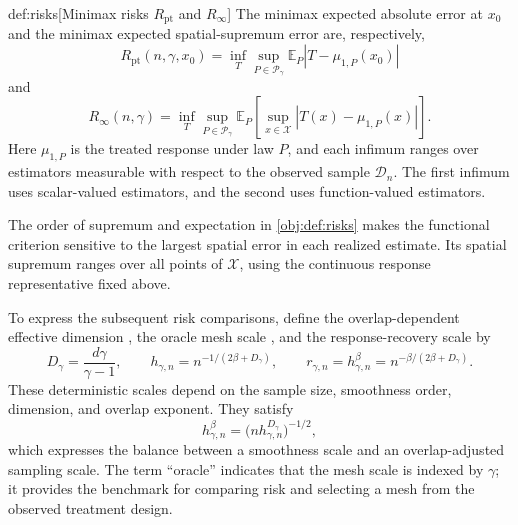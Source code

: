 \begin{definitionv}{def:risks}[Minimax risks $R_{\mathrm{pt}}$ and $R_\infty$]
The minimax expected absolute error at \(x_0\) and the minimax expected spatial-supremum error are, respectively,
\[
R_{\mathrm{pt}}(n,\gamma,x_0)
=
\inf_T\sup_{P\in\mathcal P_\gamma}
\mathbb E_P\left|T-\mu_{1,P}(x_0)\right|
\]
and
\[
R_\infty(n,\gamma)
=
\inf_T\sup_{P\in\mathcal P_\gamma}
\mathbb E_P\left[
\sup_{x\in\mathcal X}\left|T(x)-\mu_{1,P}(x)\right|
\right].
\]
Here \(\mu_{1,P}\) is the treated response under law \(P\), and each infimum ranges over estimators measurable with respect to the observed sample \(\mathcal D_n\). The first infimum uses scalar-valued estimators, and the second uses function-valued estimators.
\end{definitionv}

The order of supremum and expectation in \cref{obj:def:risks} makes the functional criterion sensitive to the largest spatial error in each realized estimate. Its spatial supremum ranges over all points of \(\mathcal X\), using the continuous response representative fixed above.

To express the subsequent risk comparisons, define the overlap-dependent effective dimension , the oracle mesh scale , and the response-recovery scale  by
\[
D_\gamma=\frac{d\gamma}{\gamma-1},
\qquad
h_{\gamma,n}=n^{-1/(2\beta+D_\gamma)},
\qquad
r_{\gamma,n}=h_{\gamma,n}^{\beta}
=n^{-\beta/(2\beta+D_\gamma)}.
\]
These deterministic scales depend on the sample size, smoothness order, dimension, and overlap exponent. They satisfy
\[
h_{\gamma,n}^{\beta}
=
\bigl(nh_{\gamma,n}^{D_\gamma}\bigr)^{-1/2},
\]
which expresses the balance between a smoothness scale and an overlap-adjusted sampling scale. The term ``oracle'' indicates that the mesh scale is indexed by \(\gamma\); it provides the benchmark for comparing risk and selecting a mesh from the observed treatment design.
